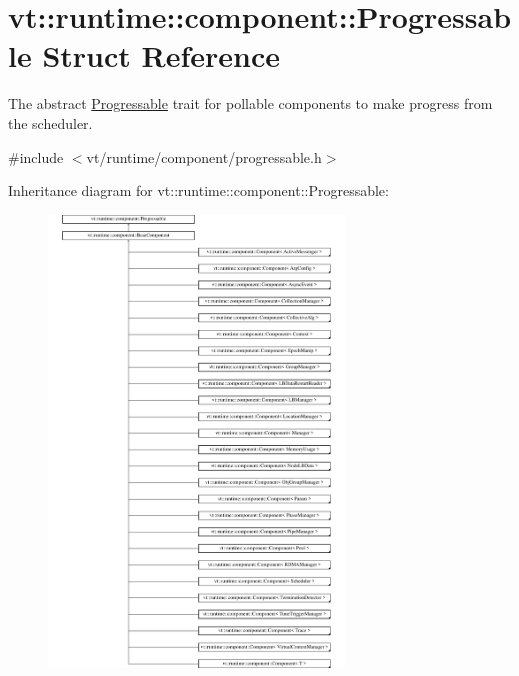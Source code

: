 \hypertarget{structvt_1_1runtime_1_1component_1_1_progressable}{}\section{vt\+:\+:runtime\+:\+:component\+:\+:Progressable Struct Reference}
\label{structvt_1_1runtime_1_1component_1_1_progressable}


The abstract {\ttfamily \hyperlink{structvt_1_1runtime_1_1component_1_1_progressable}{Progressable}} trait for pollable components to make progress from the scheduler.  




{\ttfamily \#include $<$vt/runtime/component/progressable.\+h$>$}

Inheritance diagram for vt\+:\+:runtime\+:\+:component\+:\+:Progressable\+:\begin{figure}[H]
\begin{center}
\leavevmode
\includegraphics[height=12.000000cm]{structvt_1_1runtime_1_1component_1_1_progressable}
\end{center}
\end{figure}
